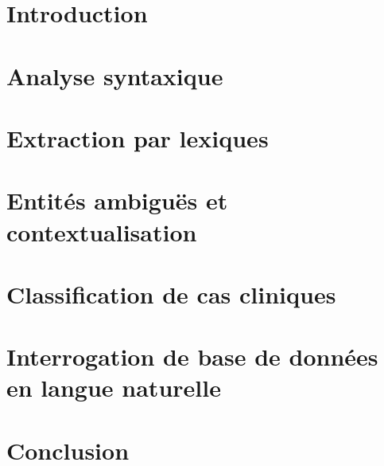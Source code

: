 \section{Introduction}


\section{Analyse syntaxique}


\section{Extraction par lexiques}
\label{sec:ie:lexicon}


\section{Entités ambiguës et contextualisation}


\section{Classification de cas cliniques}


\section{Interrogation de base de données en langue naturelle}


\section{Conclusion}

